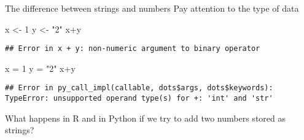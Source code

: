 \documentclass[
  10pt,
  ignorenonframetext,
  aspectratio=169]{beamer}
\newenvironment{Shaded}{\begin{snugshade}}{\end{snugshade}}
\newcommand{\DecValTok}[1]{\textcolor[rgb]{0.86,0.86,0.80}{#1}}
\newcommand{\NormalTok}[1]{\textcolor[rgb]{0.80,0.80,0.80}{#1}}
\newcommand{\OperatorTok}[1]{\textcolor[rgb]{0.94,0.94,0.82}{#1}}
\newcommand{\OtherTok}[1]{\textcolor[rgb]{0.94,0.94,0.56}{#1}}
\newcommand{\SpecialCharTok}[1]{\textcolor[rgb]{0.86,0.64,0.64}{#1}}
\newcommand{\StringTok}[1]{\textcolor[rgb]{0.80,0.58,0.58}{#1}}
\begin{document}
\begin{frame}[fragile]{The difference between strings and numbers}
\protect\hypertarget{the-difference-between-strings-and-numbers}{}
Pay attention to the type of data

\scriptsize

\begin{Shaded}
\begin{Highlighting}[]
\NormalTok{x }\OtherTok{\textless{}{-}} \DecValTok{1}
\NormalTok{y }\OtherTok{\textless{}{-}} \StringTok{"2"}
\NormalTok{x}\SpecialCharTok{+}\NormalTok{y}
\end{Highlighting}
\end{Shaded}

\begin{verbatim}
## Error in x + y: non-numeric argument to binary operator
\end{verbatim}

\begin{Shaded}
\begin{Highlighting}[]
\NormalTok{x }\OperatorTok{=} \DecValTok{1}
\NormalTok{y }\OperatorTok{=} \StringTok{"2"}
\NormalTok{x}\OperatorTok{+}\NormalTok{y}
\end{Highlighting}
\end{Shaded}

\begin{verbatim}
## Error in py_call_impl(callable, dots$args, dots$keywords): TypeError: unsupported operand type(s) for +: 'int' and 'str'
\end{verbatim}

\medskip

\normalsize

What happens in R and in Python if we try to add two numbers stored as
strings?
\end{frame}
\end{document}
